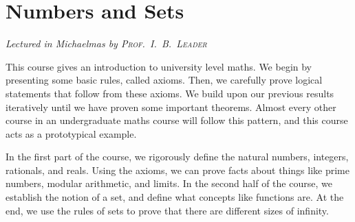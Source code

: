 \chapter[Numbers and Sets \\ \textnormal{\emph{Lectured in Michaelmas \oldstylenums{2020} by \textsc{Prof.\ I.\ B.\ Leader}}}]{Numbers and Sets}
\emph{\Large Lectured in Michaelmas  by \textsc{Prof.\ I.\ B.\ Leader}}

This course gives an introduction to university level maths.
We begin by presenting some basic rules, called axioms.
Then, we carefully prove logical statements that follow from these axioms.
We build upon our previous results iteratively until we have proven some important theorems.
Almost every other course in an undergraduate maths course will follow this pattern, and this course acts as a prototypical example.

In the first part of the course, we rigorously define the natural numbers, integers, rationals, and reals.
Using the axioms, we can prove facts about things like prime numbers, modular arithmetic, and limits.
In the second half of the course, we establish the notion of a set, and define what concepts like functions are.
At the end, we use the rules of sets to prove that there are different sizes of infinity.


